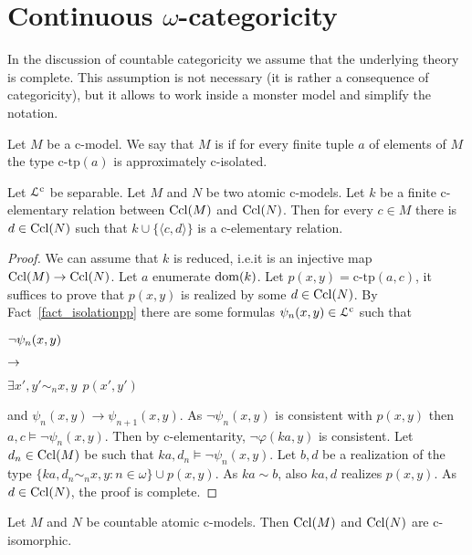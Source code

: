 \documentclass{amsproc}
\renewcommand*{\emph}[1]{%
   \smash{\tikz[baseline]\node[rectangle, fill=teal!25, rounded corners, inner xsep=0.5ex, inner ysep=0.2ex, anchor=base, minimum height = 2.7ex]{\strut #1};}}
\begin{document}
{\section{Continuous \boldmath$\omega$-categoricity}

\def\ceq#1#2#3{\parbox[t]{25ex}{$\displaystyle #1$}\parbox[t]{6ex}{$\displaystyle\hfil #2$}{$\displaystyle #3$}}

In the discussion of countable categoricity we assume that the underlying theory is complete.
This assumption is not necessary (it is rather a consequence of categoricity), but it allows to work inside a monster model and simplify the notation.

Let $M$ be a c-model.
We say that $M$ is \emph{atomic\/} if for every finite tuple $a$ of elements of $M$ the type $\mbox{c-tp}(a)$ is approximately c-isolated.

\begin{lemma}\label{lem_atomic_iso}
  Let ${\EuScript L}^{\rm c}$ be separable.
  Let $M$ and $N$ be two atomic c-models.
  Let $k$ be a finite c-elementary relation between ${\rm Ccl}(M)$ and ${\rm Ccl}(N)$.
  Then for every $c\in M$ there is $d\in{\rm Ccl}(N)$ such that $k\cup\{\langle c,d\rangle\}$ is a c-elementary relation.
\end{lemma}

\begin{proof}
  We can assume that $k$ is reduced, i.e.\@ it is an injective map ${\rm Ccl}(M)\rightarrow{\rm Ccl}(N)$.
  Let $a$ enumerate ${\rm dom}(k)$.
  Let $p(x,y)=\mbox{c-tp}(a,c)$, it suffices to prove that $p(x,y)$ is realized by some $d\in{\rm Ccl}(N)$.
  By Fact~\ref{fact_isolationpp} there are some formulas $\psi_n(x,y)\in{\EuScript L}^{\rm c}$ such that
  
  \ceq{\hfill\neg\psi_n(x,y)}{\rightarrow}{\exists x',y'\sim_nx,y\ \ p(x',y')}
  
  and $\psi_n(x,y)\rightarrow\psi_{n+1}(x,y)$.
  As $\neg\psi_n(x,y)$ is consistent with $p(x,y)$ then $a,c\models\neg\psi_n(x,y)$.
  Then by c-elementarity, $\neg\varphi(ka,y)$ is consistent.
  Let $d_n\in{\rm Ccl}(M)$ be such that $ka,d_n\models\neg\psi_n(x,y)$.
  Let $b,d$ be a realization of the type $\{ka,d_n\sim_nx,y:n\in\omega\}\cup p(x,y)$.
  As $ka\sim b$, also $ka,d$ realizes $p(x,y)$.
  As $d\in{\rm Ccl}(N)$, the proof is complete.
\end{proof}

\begin{fact}\label{fact_atomic_iso}
  Let $M$ and $N$ be countable atomic c-models.
  Then ${\rm Ccl}(M)$ and ${\rm Ccl}(N)$ are c-isomorphic.
\end{fact}

}
\end{document}

